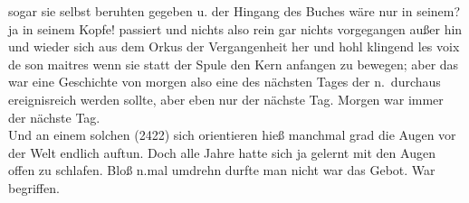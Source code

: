 \documentclass[
]{article}
\begin{document}
sogar sie selbst beruhten gegeben u. der Hingang des Buches wäre nur in
seinem? ja in seinem Kopfe! passiert und nichts also rein gar nichts
vorgegangen außer hin und wieder sich aus dem Orkus der Vergangenheit
her und hohl klingend les voix de son maitres wenn sie statt der Spule
den Kern anfangen zu bewegen; aber das war eine Geschichte von morgen
also eine des nächsten Tages der n.~durchaus ereignisreich werden
sollte, aber eben nur der nächste Tag. Morgen war immer der nächste
Tag.\\
Und an einem solchen (2422) sich orientieren hieß manchmal grad die
Augen vor der Welt endlich auftun. Doch alle Jahre hatte sich ja gelernt
mit den Augen offen zu schlafen. Bloß n.mal umdrehn durfte man nicht war
das Gebot. War begriffen.
\end{document}
